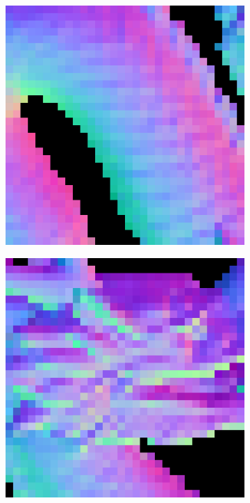 \begin{figure}[H]
	\centering
	\captionsetup{width=\linewidth}
	\begin{subfigure}[b]{0.18\linewidth}
		\includegraphics[width=\linewidth]{./Figures/trip_net_zoom_in/eval_7_22_-8_normal.png}
	\end{subfigure}
	\begin{subfigure}[b]{0.18\linewidth}
		\includegraphics[width=\linewidth]{./Figures/trip_net_zoom_in/eval_7_2_22_normal.png}

\end{subfigure}
\end{figure}
